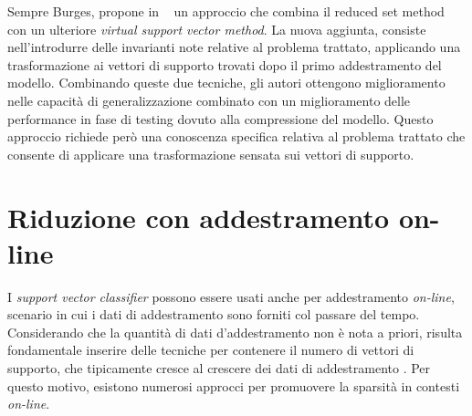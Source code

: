 Sempre Burges, propone in ~\cite{burges_improving_accuracy} un approccio che combina il reduced set method con un ulteriore \emph{virtual support vector method}. La nuova aggiunta, consiste nell'introdurre delle invarianti note relative al problema trattato, applicando una trasformazione ai vettori di supporto trovati dopo il primo addestramento del modello. Combinando queste due tecniche, gli autori ottengono miglioramento nelle capacità di generalizzazione combinato con un miglioramento delle performance in fase di testing dovuto alla compressione del modello. Questo approccio richiede però una conoscenza specifica relativa al problema trattato che consente di applicare una trasformazione sensata sui vettori di supporto.

\section{Riduzione con addestramento on-line}
I \emph{support vector classifier} possono essere usati anche per addestramento \emph{on-line}, scenario in cui i dati di addestramento sono forniti col passare del tempo. Considerando che la quantità di dati d'addestramento non è nota a priori, risulta fondamentale inserire delle tecniche per contenere il numero di vettori di supporto, che tipicamente cresce al crescere dei dati di addestramento \cite{}. Per questo motivo, esistono numerosi approcci per promuovere la sparsità in contesti \emph{on-line}.


